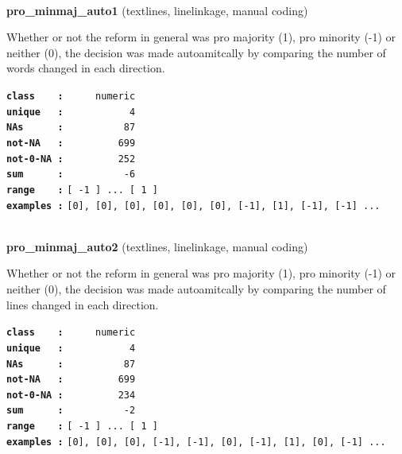 \documentclass[]{article}
\begin{document}
~

\textbf{pro\_minmaj\_auto1} (textlines, linelinkage, manual coding)

Whether or not the reform in general was pro majority (1), pro minority
(-1) or neither (0), the decision was made autoamitcally by comparing
the number of words changed in each direction.

\textbf{\texttt{class\ \ \ \ :}} \texttt{~~~~~numeric}\\
\textbf{\texttt{unique\ \ \ :}} \texttt{~~~~~~~~~~~4}\\
\textbf{\texttt{NAs\ \ \ \ \ \ :}} \texttt{~~~~~~~~~~87}\\
\textbf{\texttt{not-NA\ \ \ :}} \texttt{~~~~~~~~~699}\\
\textbf{\texttt{not-0-NA\ :}} \texttt{~~~~~~~~~252}\\
\textbf{\texttt{sum\ \ \ \ \ \ :}} \texttt{~~~~~~~~~~-6}\\
\textbf{\texttt{range\ \ \ \ :}}
\texttt{{[}\ -1\ {]}\ ...\ {[}\ 1\ {]}}\\
\textbf{\texttt{examples\ :}}
\texttt{{[}0{]},\ {[}0{]},\ {[}0{]},\ {[}0{]},\ {[}0{]},\ {[}0{]},\ {[}-1{]},\ {[}1{]},\ {[}-1{]},\ {[}-1{]}\ ...}\\

~

\textbf{pro\_minmaj\_auto2} (textlines, linelinkage, manual coding)

Whether or not the reform in general was pro majority (1), pro minority
(-1) or neither (0), the decision was made autoamitcally by comparing
the number of lines changed in each direction.

\textbf{\texttt{class\ \ \ \ :}} \texttt{~~~~~numeric}\\
\textbf{\texttt{unique\ \ \ :}} \texttt{~~~~~~~~~~~4}\\
\textbf{\texttt{NAs\ \ \ \ \ \ :}} \texttt{~~~~~~~~~~87}\\
\textbf{\texttt{not-NA\ \ \ :}} \texttt{~~~~~~~~~699}\\
\textbf{\texttt{not-0-NA\ :}} \texttt{~~~~~~~~~234}\\
\textbf{\texttt{sum\ \ \ \ \ \ :}} \texttt{~~~~~~~~~~-2}\\
\textbf{\texttt{range\ \ \ \ :}}
\texttt{{[}\ -1\ {]}\ ...\ {[}\ 1\ {]}}\\
\textbf{\texttt{examples\ :}}
\texttt{{[}0{]},\ {[}0{]},\ {[}0{]},\ {[}-1{]},\ {[}-1{]},\ {[}0{]},\ {[}-1{]},\ {[}1{]},\ {[}0{]},\ {[}-1{]}\ ...}\\
\end{document}
